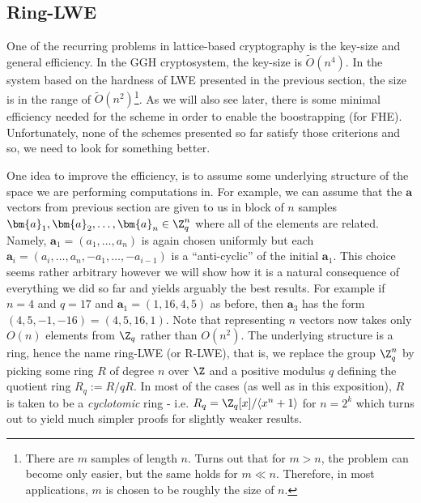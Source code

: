 
\subsection{Ring-LWE}
One of the recurring problems in lattice-based cryptography is the key-size and general efficiency. In the GGH cryptosystem, the key-size is $\tilde{O}(n^4)$. In the system based on the hardness of LWE presented in the previous section, the size is in the range of $\tilde{O}(n^2)$\footnote{There are $m$ samples of length $n$. Turns out that for $m > n$, the problem can become only easier, but the same holds for $m \ll n$. Therefore, in most applications, $m$ is chosen to be roughly the size of $n$.}. As we will also see later, there is some minimal efficiency needed for the scheme in order to enable the boostrapping (for FHE). Unfortunately, none of the schemes presented so far satisfy those criterions and so, we need to look for something better.

One idea to improve the efficiency, is to assume some underlying structure of the space we are performing computations in. For example, we can assume that the $\bm{a}$ vectors from previous section are given to us in block of $n$ samples $\bm{a}_1, \bm{a}_2, \dots, \bm{a}_n \in \Z_q^n$ where all of the elements are related. Namely, $\bm{a}_1 = (a_1, \dots, a_n)$ is again chosen uniformly but each $\bm{a}_i = (a_i, \dots, a_n, -a_1, \dots, -a_{i - 1})$ is a ``anti-cyclic'' of the initial $\bm{a}_1$. This choice seems rather arbitrary however we will show how it is a natural consequence of everything we did so far and yields arguably the best results. For example if $n = 4$ and $q = 17$ and $\bm{a}_1 = (1, 16, 4, 5)$ as before, then $\bm{a}_3$ has the form $(4, 5, -1, -16) = (4, 5, 16, 1)$. Note that representing $n$ vectors now takes only $O(n)$ elements from $\Z_q$ rather than $O(n^2)$. The underlying structure is a ring, hence the name ring-LWE (or R-LWE), that is, we replace the group $\Z_q^n$ by picking some ring $R$ of degree $n$ over $\Z$ and a positive modulus $q$ defining the quotient ring $R_q := R/qR$. In most of the cases (as well as in this exposition), $R$ is taken to be a \textit{cyclotomic} ring - i.e. $R_q = \Z_q[x]/\langle x^n + 1 \rangle$ for $n = 2^k$ which turns out to yield much simpler proofs for slightly weaker results.

